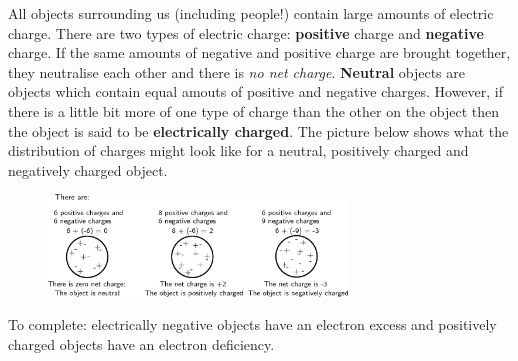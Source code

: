       
      \label{m38780*id200267}All objects surrounding us (including people!) contain large amounts of electric charge. There
are two types of electric charge: \textbf{positive} charge and \textbf{negative} charge.
If the same amounts
of negative and positive charge are brought together, they neutralise each other and there
is \textsl{no net charge}. \textbf{Neutral} objects are objects which contain equal amouts of positive
and negative charges. However, if there is a little bit more of one type of charge than the other on the
object then the object is said to be \textbf{electrically charged}. The picture below shows
what the distribution of charges might look like for a neutral, positively charged and
negatively charged object.\par 
      \label{m38780*id200640}
        
    \setcounter{subfigure}{0}


	\begin{figure}[H] %
    \begin{center}
    \label{m38780*id200643!!!underscore!!!media}\label{m38780*id200643!!!underscore!!!printimage}\includegraphics[width=300px]{col11305.imgs/m38780_PG10C8_001.png} %
        
      \vspace{2pt}
    \vspace{.1in}
    
    \end{center}

 \end{figure}   

    \addtocounter{footnote}{-0}
    
      \par \label{m38780*eip-429}To complete: electrically negative objects have an electron excess and positively charged objects have an electron deficiency.\par 
    
    
    \label{m38780*cid5}
